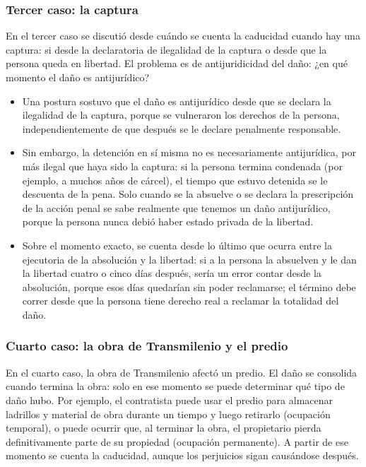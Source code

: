 \subsubsection{Tercer caso: la captura}
En el tercer caso se discutió desde cuándo se cuenta la caducidad cuando hay una captura: si desde la declaratoria de ilegalidad de la captura o desde que la persona queda en libertad. El problema es de antijuridicidad del daño: ¿en qué momento el daño es antijurídico?

\begin{itemize}
\item Una postura sostuvo que el daño es antijurídico desde que se declara la ilegalidad de la captura, porque se vulneraron los derechos de la persona, independientemente de que después se le declare penalmente responsable.
\item Sin embargo, la detención en sí misma no es necesariamente antijurídica, por más ilegal que haya sido la captura: si la persona termina condenada (por ejemplo, a muchos años de cárcel), el tiempo que estuvo detenida se le descuenta de la pena. Solo cuando se la absuelve o se declara la prescripción de la acción penal se sabe realmente que tenemos un daño antijurídico, porque la persona nunca debió haber estado privada de la libertad.
\item Sobre el momento exacto, se cuenta desde lo último que ocurra entre la ejecutoria de la absolución y la libertad: si a la persona la absuelven y le dan la libertad cuatro o cinco días después, sería un error contar desde la absolución, porque esos días quedarían sin poder reclamarse; el término debe correr desde que la persona tiene derecho real a reclamar la totalidad del daño.
\end{itemize}
\subsubsection{Cuarto caso: la obra de Transmilenio y el predio}
En el cuarto caso, la obra de Transmilenio afectó un predio. El daño se consolida cuando termina la obra: solo en ese momento se puede determinar qué tipo de daño hubo. Por ejemplo, el contratista puede usar el predio para almacenar ladrillos y material de obra durante un tiempo y luego retirarlo (ocupación temporal), o puede ocurrir que, al terminar la obra, el propietario pierda definitivamente parte de su propiedad (ocupación permanente). A partir de ese momento se cuenta la caducidad, aunque los perjuicios sigan causándose después.

